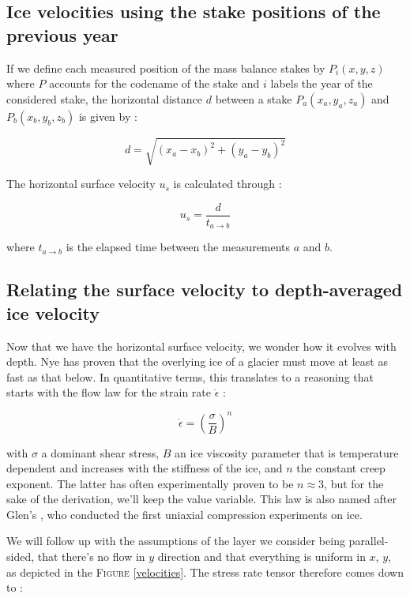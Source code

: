 \subsection*{Ice velocities using the stake positions of the previous year}

If we define each measured position of the mass balance stakes by $P_i(x,y,z)$ where $P$ accounts for the codename of the stake and $i$ labels the year of the considered stake, the horizontal distance $d$ between a stake $P_a(x_a, y_a, z_a)$ and $P_b(x_b, y_b, z_b)$ is given by :

\begin{equation}d = \sqrt{(x_a - x_b)^2 + (y_a - y_b)^2}\end{equation}

The horizontal surface velocity $u_s$ is calculated through :

\begin{equation}
\boxed{u_s = \frac{d}{t_{a \rightarrow b}}}
\end{equation}

where $t_{a \rightarrow b}$ is the elapsed time between the measurements $a$ and $b$.


\subsection*{Relating the surface velocity to depth-averaged ice velocity}

Now that we have the horizontal surface velocity, we wonder how it evolves with depth. Nye \cite{Nye1952} has proven that the overlying ice of a glacier must move at least as fast as that below. In quantitative terms, this translates to a reasoning that starts with the flow law for the strain rate $\dot{\epsilon}$ :

\begin{equation}\dot{\epsilon} = \left( \frac{\sigma}{B} \right)^n\end{equation}

with $\sigma$ a dominant shear stress, $B$ an ice viscosity parameter that is temperature dependent and increases with the stiffness of the ice, and $n$ the constant creep exponent. The latter has often experimentally proven to be $n \approx 3$, but for the sake of the derivation, we'll keep the value variable.
This law is also named after Glen's \cite{Glen1955}, who conducted the first uniaxial compression experiments on ice.

We will follow up with the assumptions of the layer we consider being parallel-sided, that there's no flow in $y$ direction and that everything is uniform in $x$, $y$, as depicted in the \textsc{Figure} \ref{velocities}. The stress rate tensor therefore comes down to :



